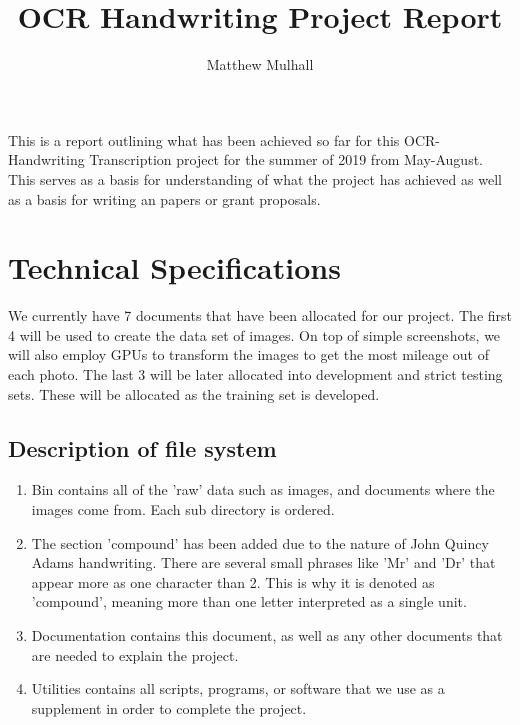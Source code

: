 \documentclass[12pt]{article} %
\title{OCR Handwriting Project Report}
\author{Matthew Mulhall}
\affil{matthew.l.mulhall@uconn.edu}
\begin{document}
\maketitle
This is a report outlining what has been achieved so far for this OCR-Handwriting Transcription project for the summer of 2019 from May-August. This serves as a basis for understanding of what the project has achieved as well as a basis for writing an papers or grant proposals.

\section{Technical Specifications}
We currently have 7 documents that have been allocated for our project. The first 4 will be used to create the data set of images. On top of simple screenshots, we will also employ GPUs to transform the images to get the most mileage out of each photo. The last 3 will be later allocated into development and strict testing sets. These will be allocated as the training set is developed.

\subsection{Description of file system}
\begin{enumerate}[label = (\roman*)]
\item Bin contains all of the 'raw' data such as images, and documents where the images come from. Each sub directory is ordered.
\item The section 'compound' has been added due to the nature of John Quincy Adams handwriting. There are several small phrases like 'Mr' and 'Dr' that appear more as one character than 2. This is why it is denoted as 'compound', meaning more than one letter interpreted as a single unit.
\item Documentation contains this document, as well as any other documents that are needed to explain the project.
\item Utilities contains all scripts, programs, or software that we use as a supplement in order to complete the project.
\end{enumerate}
\end{document}
